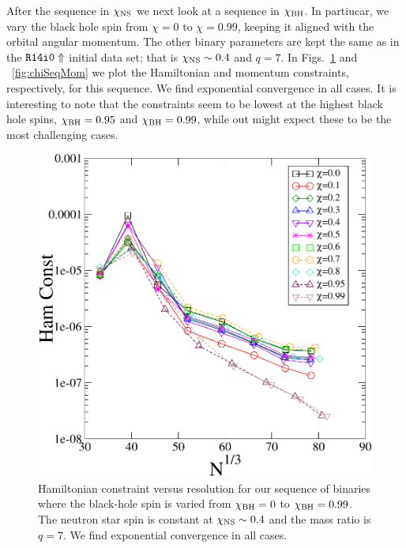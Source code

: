 After the sequence in $\chi_{\rm NS}$ we next look at a sequence in
$\chi_{\rm BH}$. In partiucar, we vary the black hole spin from
$\chi=0$ to $\chi=0.99$, keeping it aligned with the orbital angular
momentum.
 The other binary parameters are kept the same
as in the ${\tt R14i0\Uparrow}$ initial data set; that is $\chi_{\rm
  NS}\sim0.4$ and $q=7$. In Figs.~\ref{fig:chiSeqHam} and
~\ref{fig:chiSeqMom} we plot the Hamiltonian and momentum constraints,
respectively, for this sequence. We find exponential convergence in
all cases. It is interesting to note that the constraints seem to be
lowest at the highest black hole spins, $\chi_{\rm BH}=0.95$ and
$\chi_{\rm BH}=0.99$, while out might expect these to be the most
challenging cases.

\begin{figure}
\includegraphics[width=0.95\columnwidth]{chap4/chiSeqHam}
\caption[Hamiltonian constraint for the sequence in $\chi_{\rm BH}$.]{\label{fig:chiSeqHam}Hamiltonian constraint versus
  resolution for our sequence of binaries where the black-hole spin is
  varied from $\chi_{\rm BH}=0$ to $\chi_{\rm BH}=0.99$. The neutron star spin is constant at $\chi_{\rm NS}\sim 0.4$ and the mass ratio is $q=7$. We find exponential convergence in all cases.}
\end{figure}


